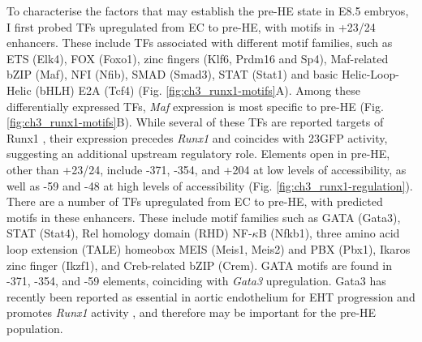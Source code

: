 To characterise the factors that may establish the pre-HE state in E8.5 embryos, I first probed TFs upregulated from EC to pre-HE, with motifs in +23/24 enhancers. These include TFs associated with different motif families, such as ETS (Elk4), FOX (Foxo1), zinc fingers (Klf6, Prdm16 and Sp4), Maf-related bZIP (Maf), NFI (Nfib), SMAD (Smad3), STAT (Stat1) and basic Helic-Loop-Helic (bHLH) E2A (Tcf4) (Fig. \ref{fig:ch3_runx1-motifs}A). Among these differentially expressed TFs, \textit{Maf} expression is most specific to pre-HE (Fig. \ref{fig:ch3_runx1-motifs}B). While several of these TFs are reported targets of Runx1 \citep{wang_intersection_2011, zaidi_integration_2002}, their expression precedes \textit{Runx1} and coincides with 23GFP activity, suggesting an additional upstream regulatory role. Elements open in pre-HE, other than +23/24, include -371, -354, and +204 at low levels of accessibility, as well as -59 and -48 at high levels of accessibility (Fig. \ref{fig:ch3_runx1-regulation}). There are a number of TFs upregulated from EC to pre-HE, with predicted motifs in these enhancers. These include motif families such as GATA (Gata3), STAT (Stat4), Rel homology domain (RHD) NF-$\kappa$B (Nfkb1), three amino acid loop extension (TALE) homeobox MEIS (Meis1, Meis2) and PBX (Pbx1), Ikaros zinc finger (Ikzf1), and Creb-related bZIP (Crem). GATA motifs are found in -371, -354, and -59 elements, coinciding with \textit{Gata3} upregulation. Gata3 has recently been reported as essential in aortic endothelium for EHT progression and promotes \textit{Runx1} activity \citep{zaidan_endothelial-specific_2022}, and therefore may be important for the pre-HE population. 

